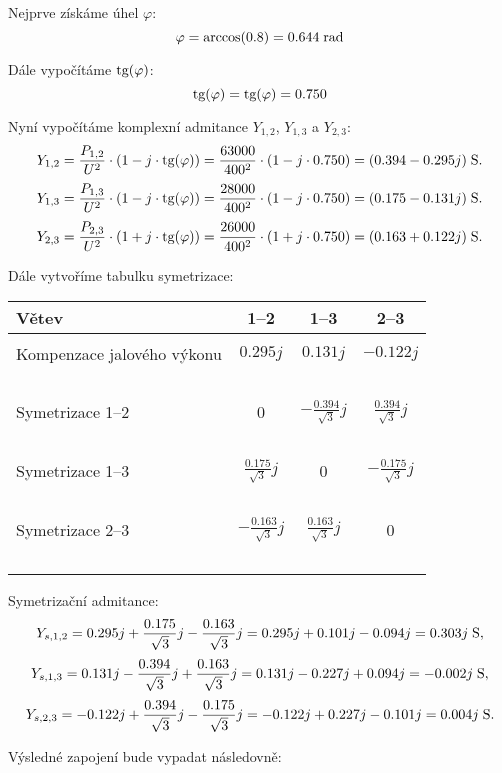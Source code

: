 
    
    Nejprve získáme úhel $\varphi$:
    $$ \varphi = \arccos(0.8) = 0.644 \; \textrm{rad}$$
    
    Dále vypočítáme $\textrm{tg} (\varphi)$:
    $$\textrm{tg} (\varphi) = \textrm{tg} (\varphi) = 0.750$$

    Nyní vypočítáme komplexní admitance $Y_{1,2}$, $Y_{1,3}$ a $Y_{2,3}$:
    $$Y_{1,2} = \frac{P_{1,2}}{U^2} \cdot \left(1 - j \cdot \textrm{tg} (\varphi) \right) = \frac{ 63000 }{ 400^2 } \cdot \left(1 - j \cdot 0.750 \right) = (0.394 - 0.295j) \; \textrm{S}.$$$$Y_{1,3} = \frac{P_{1,3}}{U^2} \cdot \left(1 - j \cdot \textrm{tg} (\varphi) \right) = \frac{ 28000 }{ 400^2 } \cdot \left(1 - j \cdot 0.750 \right) = (0.175 - 0.131j) \; \textrm{S}.$$$$Y_{2,3} = \frac{P_{2,3}}{U^2} \cdot \left(1 + j \cdot \textrm{tg} (\varphi) \right) = \frac{ 26000 }{ 400^2 } \cdot \left(1 + j \cdot 0.750 \right) = (0.163 + 0.122j) \; \textrm{S}.$$

    Dále vytvoříme tabulku symetrizace:
    \begin{table}[H]
    \centering
    \begin{tabular}{l c c c}
    \hline
    Větev & 1--2 & 1--3 & 2--3 \\ \hline \\Kompenzace jalového výkonu & $0.295j$ & $0.131j$ & $-0.122j$ \\~\\Symetrizace 1--2 & 0 & $-\frac{0.394}{\sqrt{3}}j$ & $\frac{0.394}{\sqrt{3}}j$ \\~\\Symetrizace 1--3 & $\frac{0.175}{\sqrt{3}}j$ & 0 & $-\frac{0.175}{\sqrt{3}}j$ \\~\\Symetrizace 2--3 & $-\frac{0.163}{\sqrt{3}}j$ & $\frac{0.163}{\sqrt{3}}j$ & 0
    \\~\\
    \hline
    \end{tabular}
    \end{table}
    

    Symetrizační admitance:
    $$Y_{s,1,2} = 0.295j+\frac{0.175}{\sqrt{3}}j-\frac{0.163}{\sqrt{3}}j = 0.295j+0.101j-0.094j = 0.303j \; \textrm{S},$$$$Y_{s,1,3} = 0.131j-\frac{0.394}{\sqrt{3}}j+\frac{0.163}{\sqrt{3}}j = 0.131j-0.227j+0.094j = -0.002j \; \textrm{S},$$$$Y_{s,2,3} = -0.122j+\frac{0.394}{\sqrt{3}}j-\frac{0.175}{\sqrt{3}}j = -0.122j+0.227j-0.101j = 0.004j \; \textrm{S}.$$

    Výsledné zapojení bude vypadat následovně:
    
